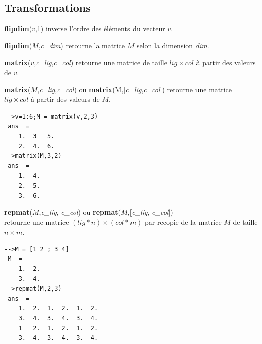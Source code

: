 \documentclass{article}
\begin{document}
\begin{multicols}{3}
\subsection*{Transformations}
\begin{description}
\item{\textbf{flipdim}($v$,1)} inverse l'ordre des éléments du vecteur $v$.
\item{\textbf{flipdim}($M$,\textit{c\_dim})} retourne la matrice $M$ selon la dimension \textit{dim}.
\item{\textbf{matrix}($v$,\textit{c\_lig},\textit{c\_col})} retourne une matrice de taille $lig \times col$ à partir des valeurs de $v$.
\item{\textbf{matrix}($M$,\textit{c\_lig},\textit{c\_col}) ou \textbf{matrix}(M,[\textit{c\_lig},\textit{c\_col}])} retourne une matrice $lig \times col$ à partir des valeurs de $M$.
\begin{verbatim}
-->v=1:6;M = matrix(v,2,3)
 ans  =
    1.  3   5.  
    2.  4.  6. 
-->matrix(M,3,2)
 ans  =
    1.  4.  
    2.  5.  
    3.  6.
\end{verbatim}
\item{\textbf{repmat}($M$,\textit{c\_lig}, \textit{c\_col}) ou \textbf{repmat}($M$,[\textit{c\_lig}, \textit{c\_col}])}\\ retourne une matrice $(lig * n) \times (col * m)$  par recopie de la matrice $M$ de taille $n \times m$.
\begin{verbatim}
-->M = [1 2 ; 3 4]
 M  =
    1.  2.  
    3.  4.  
-->repmat(M,2,3)
 ans  =
    1.  2.  1.  2.  1.  2.  
    3.  4.  3.  4.  3.  4.  
    1   2.  1.  2.  1.  2.  
    3.  4.  3.  4.  3.  4.
\end{verbatim}
\end{description}

\end{multicols}
\end{document}
